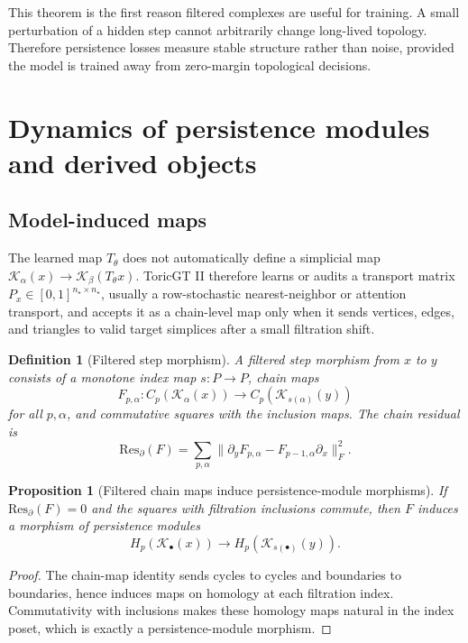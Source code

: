\documentclass[10pt]{article}
\newtheorem{proposition}[theorem]{Proposition}
\newtheorem{definition}[theorem]{Definition}
\newcommand{\calK}{\mathcal{K}}
\numberwithin{equation}{section}
\begin{document}
This theorem is the first reason filtered complexes are useful for training. A small perturbation of a hidden step cannot arbitrarily change long-lived topology. Therefore persistence losses measure stable structure rather than noise, provided the model is trained away from zero-margin topological decisions.

\section{Dynamics of persistence modules and derived objects}
\subsection{Model-induced maps}
The learned map $T_\theta$ does not automatically define a simplicial map $\calK_\alpha(x)\to\calK_\beta(T_\theta x)$. ToricGT II therefore learns or audits a transport matrix $P_x\in[0,1]^{n_\star\times n_\star}$, usually a row-stochastic nearest-neighbor or attention transport, and accepts it as a chain-level map only when it sends vertices, edges, and triangles to valid target simplices after a small filtration shift.

\begin{definition}[Filtered step morphism]
A filtered step morphism from $x$ to $y$ consists of a monotone index map $s:P\to P$, chain maps
\begin{equation}
F_{p,\alpha}:C_p(\calK_\alpha(x))\to C_p(\calK_{s(\alpha)}(y))
\end{equation}
for all $p,\alpha$, and commutative squares with the inclusion maps. The chain residual is
\begin{equation}
\mathrm{Res}_{\partial}(F)=\sum_{p,\alpha}\|\partial_y F_{p,\alpha}-F_{p-1,\alpha}\partial_x\|_F^2.
\end{equation}
\end{definition}

\begin{proposition}[Filtered chain maps induce persistence-module morphisms]
If $\mathrm{Res}_{\partial}(F)=0$ and the squares with filtration inclusions commute, then $F$ induces a morphism of persistence modules
\begin{equation}
H_p(\calK_\bullet(x))\longrightarrow H_p(\calK_{s(\bullet)}(y)).
\end{equation}
\end{proposition}
\begin{proof}
The chain-map identity sends cycles to cycles and boundaries to boundaries, hence induces maps on homology at each filtration index. Commutativity with inclusions makes these homology maps natural in the index poset, which is exactly a persistence-module morphism.
\end{proof}
\end{document}
